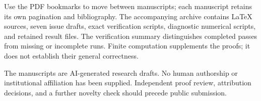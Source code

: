 Use the PDF bookmarks to move between manuscripts; each manuscript retains its own pagination and bibliography. The accompanying archive contains LaTeX sources, seven issue drafts, exact verification scripts, diagnostic numerical scripts, and retained result files. The verification summary distinguishes completed passes from missing or incomplete runs. Finite computation supplements the proofs; it does not establish their general correctness.

The manuscripts are AI-generated research drafts. No human authorship or institutional affiliation has been supplied. Independent proof review, attribution decisions, and a further novelty check should precede public submission.

